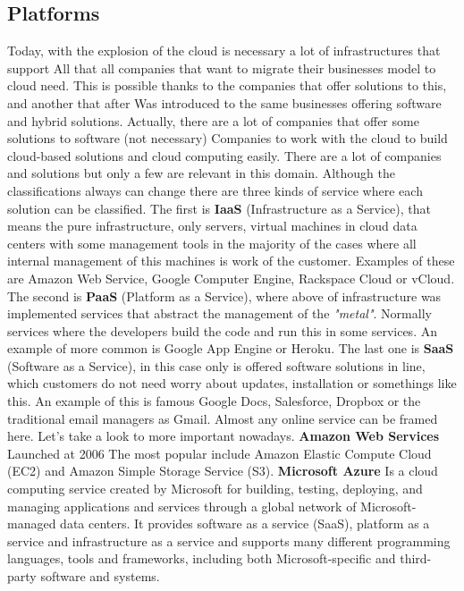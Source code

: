 \subsection{Platforms}

Today, with the explosion of the cloud is necessary a lot of infrastructures that support
All that all companies that want to migrate their businesses model to cloud need.
This is possible thanks to the companies that offer solutions to this, and another that after
Was introduced to the same businesses offering software and hybrid solutions.
Actually, there are a lot of companies that offer some solutions to software (not necessary)
Companies to work with the cloud to build cloud-based solutions and cloud computing easily.
\intro
There are a lot of companies and solutions but only a few are relevant in this domain.
Although the classifications always can change there are three kinds of service
where each solution can be classified.
\intro
The first is \textbf{IaaS} (Infrastructure as a Service), that means the pure
infrastructure, only servers, virtual machines in cloud data centers with some
 management tools in the majority of the cases where all internal management of
 this machines is work of the customer. Examples of these are
Amazon Web Service, Google Computer Engine, Rackspace Cloud or vCloud.
The second is
\intro
\textbf{PaaS} (Platform as a Service), where above of infrastructure was implemented
services that abstract the management of the \textit{"metal"}. Normally services
where the developers build the code and run this in some services. An example of more
common is Google App Engine or Heroku.
\intro
The last one is \textbf{SaaS} (Software as a Service), in this case only is offered
software solutions in line, which customers do not need worry about updates,
installation or somethings like this. An example of this is famous Google Docs,
Salesforce, Dropbox or the traditional email managers as Gmail. Almost any online
service can be framed here.
Let's take a look to more important nowadays.
\intro
\textbf{Amazon Web Services}
\intro
Launched at 2006 The most popular include Amazon Elastic
Compute Cloud (EC2) and Amazon Simple Storage Service (S3).
\intro
\textbf{Microsoft Azure}
\intro
Is a cloud computing service created by Microsoft for building, testing, deploying,
and managing applications and services through a global network of Microsoft-managed
data centers. It provides software as a service (SaaS), platform as a service and
infrastructure as a service and supports many different programming languages,
tools and frameworks, including both Microsoft-specific and third-party software and systems.
